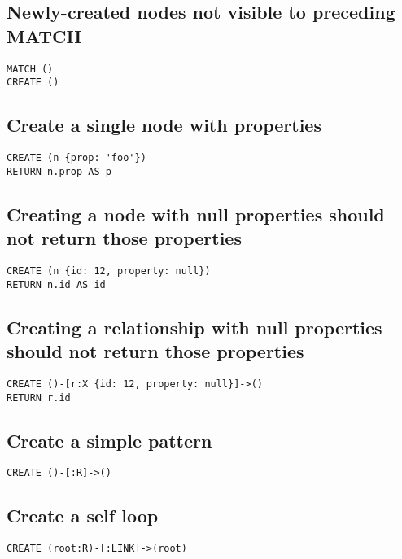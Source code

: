 \subsection{Newly-created nodes not visible to preceding MATCH}

\begin{lstlisting}
MATCH ()
CREATE ()
\end{lstlisting}

\subsection{Create a single node with properties}

\begin{lstlisting}
CREATE (n {prop: 'foo'})
RETURN n.prop AS p
\end{lstlisting}

\subsection{Creating a node with null properties should not return those properties}

\begin{lstlisting}
CREATE (n {id: 12, property: null})
RETURN n.id AS id
\end{lstlisting}

\subsection{Creating a relationship with null properties should not return those properties}

\begin{lstlisting}
CREATE ()-[r:X {id: 12, property: null}]->()
RETURN r.id
\end{lstlisting}

\subsection{Create a simple pattern}

\begin{lstlisting}
CREATE ()-[:R]->()
\end{lstlisting}

\subsection{Create a self loop}

\begin{lstlisting}
CREATE (root:R)-[:LINK]->(root)
\end{lstlisting}


